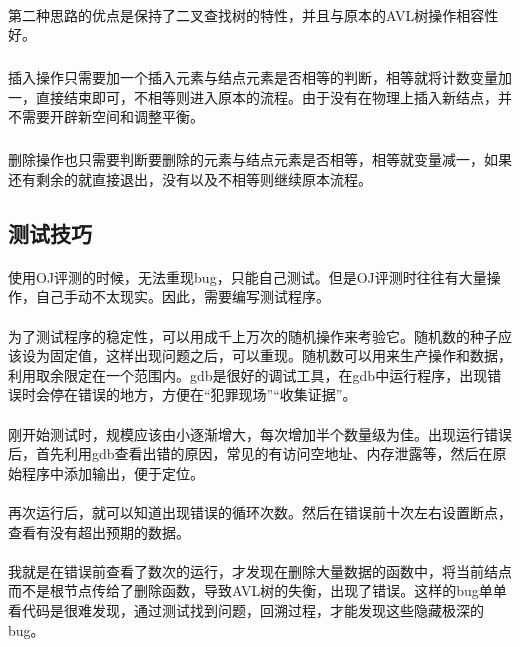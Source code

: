 \documentclass[UTF-8, 12pt]{ctexart}
\begin{document}
    \paragraph{}
    第二种思路的优点是保持了二叉查找树的特性，并且与原本的AVL树操作相容性好。
    \subparagraph{}
    插入操作只需要加一个插入元素与结点元素是否相等的判断，相等就将计数变量加一，直接结束即可，不相等则进入原本的流程。由于没有在物理上插入新结点，并不需要开辟新空间和调整平衡。
    \subparagraph{}
    删除操作也只需要判断要删除的元素与结点元素是否相等，相等就变量减一，如果还有剩余的就直接退出，没有以及不相等则继续原本流程。
    
    \subsection{测试技巧}
    \paragraph{}
    使用OJ评测的时候，无法重现bug，只能自己测试。但是OJ评测时往往有大量操作，自己手动不太现实。因此，需要编写测试程序。
    \paragraph{}
    为了测试程序的稳定性，可以用成千上万次的随机操作来考验它。随机数的种子应该设为固定值，这样出现问题之后，可以重现。随机数可以用来生产操作和数据，利用取余限定在一个范围内。gdb是很好的调试工具，在gdb中运行程序，出现错误时会停在错误的地方，方便在“犯罪现场”“收集证据”。
    \paragraph{}
    刚开始测试时，规模应该由小逐渐增大，每次增加半个数量级为佳。出现运行错误后，首先利用gdb查看出错的原因，常见的有访问空地址、内存泄露等，然后在原始程序中添加输出，便于定位。
    \paragraph{}
    再次运行后，就可以知道出现错误的循环次数。然后在错误前十次左右设置断点，查看有没有超出预期的数据。
    \paragraph{}
    我就是在错误前查看了数次的运行，才发现在删除大量数据的函数中，将当前结点而不是根节点传给了删除函数，导致AVL树的失衡，出现了错误。这样的bug单单看代码是很难发现，通过测试找到问题，回溯过程，才能发现这些隐藏极深的bug。
\end{document}
